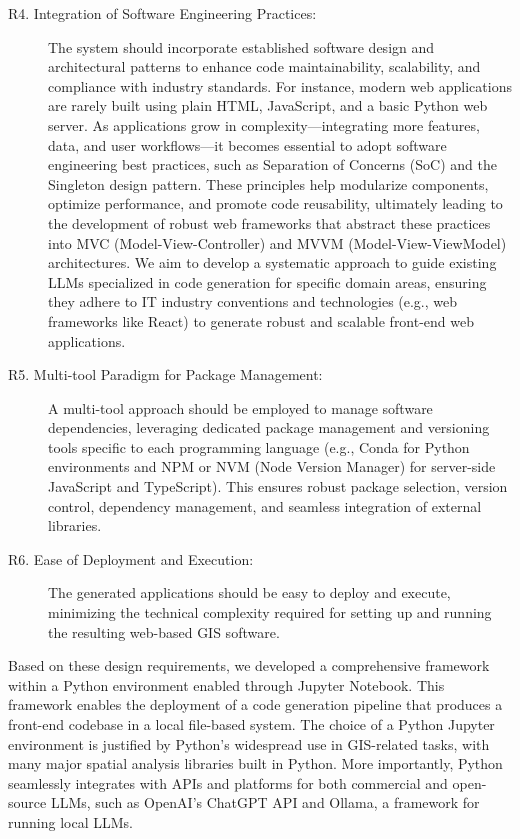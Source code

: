 \begin{description}
    \item[R4. Integration of Software Engineering Practices:]  
    The system should incorporate established software design and architectural patterns to enhance code maintainability, scalability, and compliance with industry standards. For instance, modern web applications are rarely built using plain HTML, JavaScript, and a basic Python web server. As applications grow in complexity—integrating more features, data, and user workflows—it becomes essential to adopt software engineering best practices, such as Separation of Concerns (SoC) and the Singleton design pattern. These principles help modularize components, optimize performance, and promote code reusability, ultimately leading to the development of robust web frameworks that abstract these practices into MVC (Model-View-Controller) and MVVM (Model-View-ViewModel) architectures. We aim to develop a systematic approach to guide existing LLMs specialized in code generation for specific domain areas, ensuring they adhere to IT industry conventions and technologies (e.g., web frameworks like React) to generate robust and scalable front-end web applications.
    
    \item[R5. Multi-tool Paradigm for Package Management:]  
    A multi-tool approach should be employed to manage software dependencies, leveraging dedicated package management and versioning tools specific to each programming language (e.g., Conda for Python environments and NPM or NVM (Node Version Manager) for server-side JavaScript and TypeScript). This ensures robust package selection, version control, dependency management, and seamless integration of external libraries.
    
    \item[R6. Ease of Deployment and Execution:]  
    The generated applications should be easy to deploy and execute, minimizing the technical complexity required for setting up and running the resulting web-based GIS software. 
\end{description}
Based on these design requirements, we developed a comprehensive framework within a Python environment enabled through Jupyter Notebook. This framework enables the deployment of a code generation pipeline that produces a front-end codebase in a local file-based system. The choice of a Python Jupyter environment is justified by Python’s widespread use in GIS-related tasks, with many major spatial analysis libraries built in Python. More importantly, Python seamlessly integrates with APIs and platforms for both commercial and open-source LLMs, such as OpenAI's ChatGPT API and Ollama, a framework for running local LLMs.


